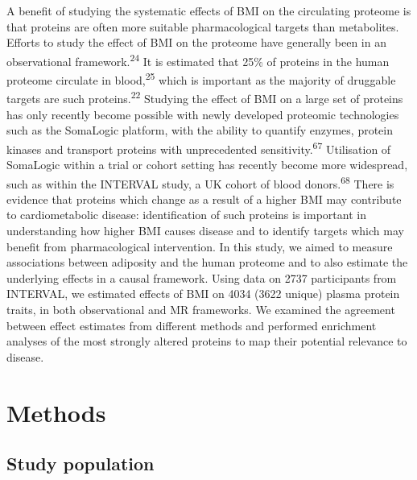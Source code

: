 \documentclass[11pt,twoside]{bristolthesis}
\begin{document}
A benefit of studying the systematic effects of BMI on the circulating proteome is that proteins are often more suitable pharmacological targets than metabolites. Efforts to study the effect of BMI on the proteome have generally been in an observational framework.\textsuperscript{24} It is estimated that 25\% of proteins in the human proteome circulate in blood,\textsuperscript{25} which is important as the majority of druggable targets are such proteins.\textsuperscript{22} Studying the effect of BMI on a large set of proteins has only recently become possible with newly developed proteomic technologies such as the SomaLogic platform, with the ability to quantify enzymes, protein kinases and transport proteins with unprecedented sensitivity.\textsuperscript{67} Utilisation of SomaLogic within a trial or cohort setting has recently become more widespread, such as within the INTERVAL study, a UK cohort of blood donors.\textsuperscript{68} There is evidence that proteins which change as a result of a higher BMI may contribute to cardiometabolic disease: identification of such proteins is important in understanding how higher BMI causes disease and to identify targets which may benefit from pharmacological intervention.
In this study, we aimed to measure associations between adiposity and the human proteome and to also estimate the underlying effects in a causal framework. Using data on 2737 participants from INTERVAL, we estimated effects of BMI on 4034 (3622 unique) plasma protein traits, in both observational and MR frameworks. We examined the agreement between effect estimates from different methods and performed enrichment analyses of the most strongly altered proteins to map their potential relevance to disease.

\hypertarget{methods-3}{%
\section{Methods}\label{methods-3}}

\hypertarget{study-population-2}{%
\subsection{Study population}\label{study-population-2}}
\end{document}
